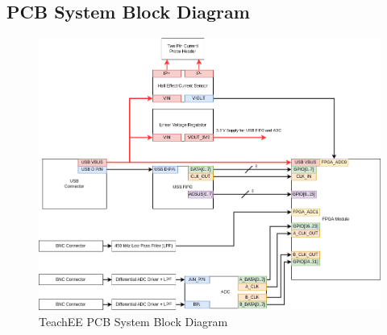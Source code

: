 \documentclass[letterpaper,12pt]{article}
\begin{document}
    \begin{appendices}
        \section{PCB System Block Diagram}
        \label{appendix:block-diagram}
        \begin{figure}[H]
            \centering
            \includegraphics[width=16cm]{../../misc/TeachEE-System-Diagram.drawio.png}
            \caption{TeachEE PCB System Block Diagram}
            \label{fig:pcb-block-diagram}
        \end{figure}
        \begin{landscape}

\end{landscape}
\end{appendices}
\end{document}
